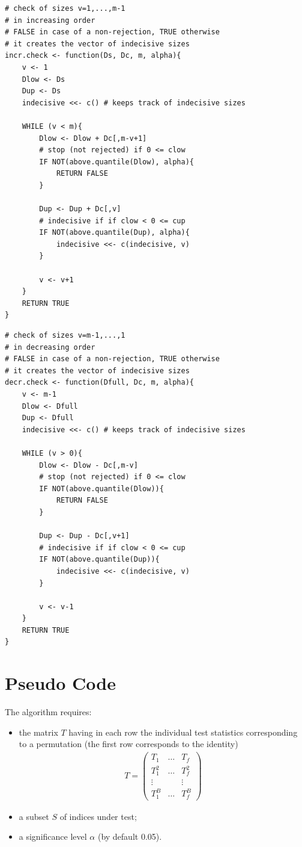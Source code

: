 \documentclass[11pt,a4paper,openright,twoside]{article}
\begin{document}
\begin{lstlisting}
# check of sizes v=1,...,m-1
# in increasing order
# FALSE in case of a non-rejection, TRUE otherwise
# it creates the vector of indecisive sizes
incr.check <- function(Ds, Dc, m, alpha){
	v <- 1
	Dlow <- Ds
	Dup <- Ds
	indecisive <<- c() # keeps track of indecisive sizes

	WHILE (v < m){
		Dlow <- Dlow + Dc[,m-v+1]
		# stop (not rejected) if 0 <= clow
		IF NOT(above.quantile(Dlow), alpha){
			RETURN FALSE
		}

		Dup <- Dup + Dc[,v]
		# indecisive if if clow < 0 <= cup
		IF NOT(above.quantile(Dup), alpha){
			indecisive <<- c(indecisive, v)
		}
	
		v <- v+1
	}
	RETURN TRUE
}
\end{lstlisting}

\begin{lstlisting}
# check of sizes v=m-1,...,1
# in decreasing order
# FALSE in case of a non-rejection, TRUE otherwise
# it creates the vector of indecisive sizes
decr.check <- function(Dfull, Dc, m, alpha){
	v <- m-1
	Dlow <- Dfull
	Dup <- Dfull
	indecisive <<- c() # keeps track of indecisive sizes

	WHILE (v > 0){
		Dlow <- Dlow - Dc[,m-v]
		# stop (not rejected) if 0 <= clow
		IF NOT(above.quantile(Dlow)){
			RETURN FALSE
		}

		Dup <- Dup - Dc[,v+1]
		# indecisive if if clow < 0 <= cup
		IF NOT(above.quantile(Dup)){
			indecisive <<- c(indecisive, v)
		}
	
		v <- v-1
	}
	RETURN TRUE
}
\end{lstlisting}



\newpage
\section{Pseudo Code}
The algorithm requires:
\begin{itemize}
\item the matrix $T$ having in each row the individual test statistics corresponding to a permutation (the first row corresponds to the identity)
\begin{align*}
T=
\begin{pmatrix}
T_1 & \ldots & T_f\\
T_1^2 & \ldots & T_f^2\\
\vdots &  & \vdots\\
T_1^B & \ldots & T_f^B
\end{pmatrix}
\end{align*}
\item a subset $S$ of indices under test;
\item a significance level $\alpha$ (by default 0.05).
\end{itemize}
\end{document}
